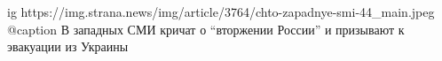  
 
 
 
 

\ifcmt
  ig https://img.strana.news/img/article/3764/chto-zapadnye-smi-44_main.jpeg
  @caption В западных СМИ кричат о \enquote{вторжении России} и призывают к эвакуации из Украины 
\fi
